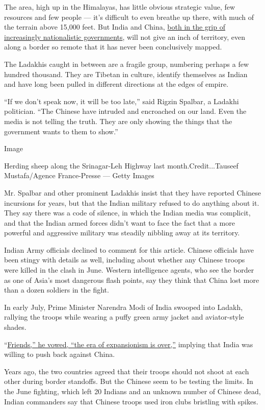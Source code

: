 The area, high up in the Himalayas, has little obvious strategic value,
few resources and few people --- it's difficult to even breathe up
there, with much of the terrain above 15,000 feet. But India and China,
\href{https://www.nytimes.com/2020/06/17/world/asia/china-india-border.html}{both
in the grip of increasingly nationalistic governments}, will not give an
inch of territory, even along a border so remote that it has never been
conclusively mapped.

The Ladakhis caught in between are a fragile group, numbering perhaps a
few hundred thousand. They are Tibetan in culture, identify themselves
as Indian and have long been pulled in different directions at the edges
of empire.

``If we don't speak now, it will be too late,'' said Rigzin Spalbar, a
Ladakhi politician. ``The Chinese have intruded and encroached on our
land. Even the media is not telling the truth. They are only showing the
things that the government wants to them to show.''

Image

Herding sheep along the Srinagar-Leh Highway last month.Credit...Tauseef
Mustafa/Agence France-Presse --- Getty Images

Mr. Spalbar and other prominent Ladakhis insist that they have reported
Chinese incursions for years, but that the Indian military refused to do
anything about it. They say there was a code of silence, in which the
Indian media was complicit, and that the Indian armed forces didn't want
to face the fact that a more powerful and aggressive military was
steadily nibbling away at its territory.

Indian Army officials declined to comment for this article. Chinese
officials have been stingy with details as well, including about whether
any Chinese troops were killed in the clash in June. Western
intelligence agents, who see the border as one of Asia's most dangerous
flash points, say they think that China lost more than a dozen soldiers
in the fight.

In early July, Prime Minister Narendra Modi of India swooped into
Ladakh, rallying the troops while wearing a puffy green army jacket and
aviator-style shades.

``\href{https://www.youtube.com/watch?v=MAb4JWywUAA\&feature=youtu.be}{Friends,''
he vowed, ``the era of expansionism is over,''} implying that India was
willing to push back against China.

Years ago, the two countries agreed that their troops should not shoot
at each other during border standoffs. But the Chinese seem to be
testing the limits. In the June fighting, which left 20 Indians and an
unknown number of Chinese dead, Indian commanders say that Chinese
troops used iron clubs bristling with spikes.

